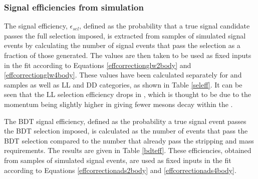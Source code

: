 \subsubsection{Signal efficiencies from simulation}
\label{sec:cpfit:efficiencies:signal}

The signal efficiency, $\epsilon_{sel}$, defined as the probability that a true signal candidate passes the full selection imposed, is extracted from samples of simulated signal events by calculating the number of signal events that pass the selection as a fraction of those generated. The values are then taken to be used as fixed inputs in the \CP fit according to Equations \ref{effcorrectionglw2body} and \ref{effcorrectionglw4body}. These values have been calculated separately for \runone and \runtwo samples as well as LL and DD categories, as shown in Table \ref{seleff}. It can be seen that the LL selection efficiency drops in \runtwo, which is thought to be due to the \KS momentum being slightly higher in \runtwo giving fewer \KS mesons decay within the \velo. 

\begin{table}[h]
\centering
{}
\caption{Summary of the selection efficiencies used in the \CP fit.}
\label{seleff}
\end{table}

The BDT signal efficiency, defined as the probability a true signal event passes the BDT selection imposed, is calculated as the number of events that pass the BDT selection compared to the number that already pass the stripping and mass requirements. The results are given in Table \ref{bdteff}. These efficiencies, obtained from samples of simulated signal events, are used as fixed inputs in the \CP fit according to Equations \ref{effcorrectionads2body} and \ref{effcorrectionads4body}. 

